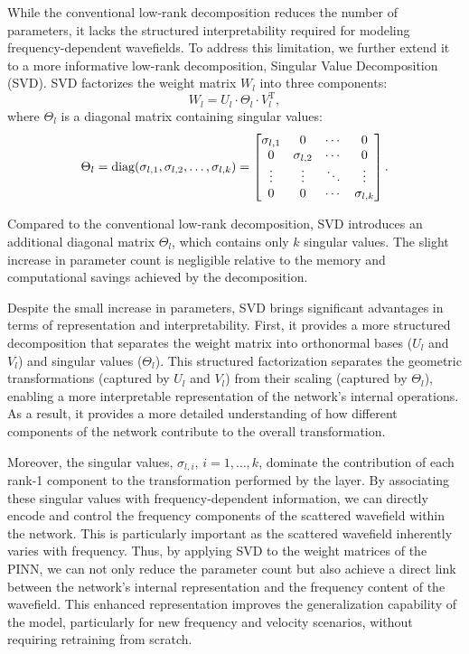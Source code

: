 While the conventional low-rank decomposition reduces the number of parameters, it lacks the structured interpretability required for modeling frequency-dependent wavefields. To address this limitation, we further extend it to a more informative low-rank decomposition, Singular Value Decomposition (SVD). SVD factorizes the weight matrix $W_l$ into three components:
\begin{equation}\label{eq8}
W_l = U_l \cdot \Theta_l \cdot V_l^\text{T},
\end{equation}
where $\Theta_l$ is a diagonal matrix containing singular values:
\begin{equation}\label{eq9}
\Theta_l = \text{diag}(\sigma_{l,1}, \sigma_{l,2}, \dots, \sigma_{l,k}) = 
\begin{bmatrix}
\sigma_{l,1} & 0 & \cdots & 0 \\
0 & \sigma_{l,2} & \cdots & 0 \\
\vdots & \vdots & \ddots & \vdots \\
0 & 0 & \cdots & \sigma_{l,k}
\end{bmatrix}.\\
\end{equation}

Compared to the conventional low-rank decomposition, SVD introduces an additional diagonal matrix $\Theta_l$, which contains only $k$ singular values. The slight increase in parameter count is negligible relative to the memory and computational savings achieved by the decomposition. 

Despite the small increase in parameters, SVD brings significant advantages in terms of representation and interpretability. First, it provides a more structured decomposition that separates the weight matrix into orthonormal bases ($U_l$ and $V_l$) and singular values ($\Theta_l$). This structured factorization separates the geometric transformations (captured by \(U_l\) and \(V_l\)) from their scaling (captured by \(\Theta_l\)), enabling a more interpretable representation of the network's internal operations. As a result, it provides a more detailed understanding of how different components of the network contribute to the overall transformation. 

Moreover, the singular values, $\sigma_{l,i}$, $i=1,\ldots,k$, dominate the contribution of each rank-1 component to the transformation performed by the layer. By associating these singular values with frequency-dependent information, we can directly encode and control the frequency components of the scattered wavefield within the network. This is particularly important as the scattered wavefield inherently varies with frequency. Thus, by applying SVD to the weight matrices of the PINN, we can not only reduce the parameter count but also achieve a direct link between the network's internal representation and the frequency content of the wavefield. This enhanced representation improves the generalization capability of the model, particularly for new frequency and velocity scenarios, without requiring retraining from scratch. \\

